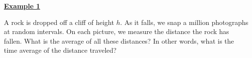 \textbf{\underline{Example 1}}

A rock is dropped off a cliff of height $h$. As it falls, we snap a million photographs at random intervals.
On each picture, we measure the distance the rock has fallen. What is the average of all these distances? In other
words, what is the time average of the distance traveled?